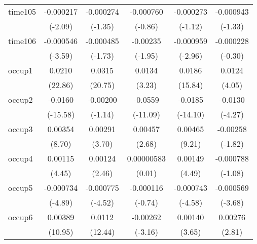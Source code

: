 \begin{table}[htbp]
\begin{tabular}{l*{5}{c}}
time105     &   -0.000217\sym{*}  &   -0.000274         &   -0.000760         &   -0.000273         &   -0.000943         \\
            &     (-2.09)         &     (-1.35)         &     (-0.86)         &     (-1.12)         &     (-1.33)         \\
time106     &   -0.000546\sym{***}&   -0.000485         &    -0.00235         &   -0.000959\sym{**} &   -0.000228         \\
            &     (-3.59)         &     (-1.73)         &     (-1.95)         &     (-2.96)         &     (-0.30)         \\
occup1      &      0.0210\sym{***}&      0.0315\sym{***}&      0.0134\sym{**} &      0.0186\sym{***}&      0.0124\sym{***}\\
            &     (22.86)         &     (20.75)         &      (3.23)         &     (15.84)         &      (4.05)         \\
occup2      &     -0.0160\sym{***}&    -0.00200         &     -0.0559\sym{***}&     -0.0185\sym{***}&     -0.0130\sym{***}\\
            &    (-15.58)         &     (-1.14)         &    (-11.09)         &    (-14.10)         &     (-4.27)         \\
occup3      &     0.00354\sym{***}&     0.00291\sym{***}&     0.00457\sym{**} &     0.00465\sym{***}&    -0.00258         \\
            &      (8.70)         &      (3.70)         &      (2.68)         &      (9.21)         &     (-1.82)         \\
occup4      &     0.00115\sym{***}&     0.00124\sym{*}  &  0.00000583         &     0.00149\sym{***}&   -0.000788         \\
            &      (4.45)         &      (2.46)         &      (0.01)         &      (4.49)         &     (-1.08)         \\
occup5      &   -0.000734\sym{***}&   -0.000775\sym{***}&   -0.000116         &   -0.000743\sym{***}&   -0.000569\sym{***}\\
            &     (-4.89)         &     (-4.52)         &     (-0.74)         &     (-4.58)         &     (-3.68)         \\
occup6      &     0.00389\sym{***}&      0.0112\sym{***}&    -0.00262\sym{**} &     0.00140\sym{***}&     0.00276\sym{**} \\
            &     (10.95)         &     (12.44)         &     (-3.16)         &      (3.65)         &      (2.81)         \\

\end{tabular}
\end{table}
